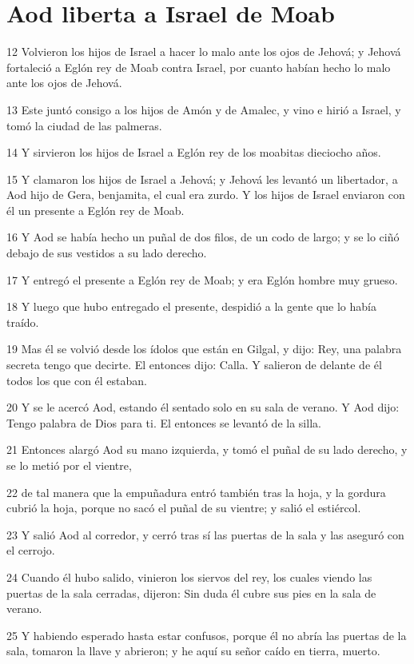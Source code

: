\section*{Aod liberta a Israel de Moab}

\par 12 Volvieron los hijos de Israel a hacer lo malo ante los ojos de Jehová; y Jehová fortaleció a Eglón rey de Moab contra Israel, por cuanto habían hecho lo malo ante los ojos de Jehová.
\par 13 Este juntó consigo a los hijos de Amón y de Amalec, y vino e hirió a Israel, y tomó la ciudad de las palmeras.
\par 14 Y sirvieron los hijos de Israel a Eglón rey de los moabitas dieciocho años.
\par 15 Y clamaron los hijos de Israel a Jehová; y Jehová les levantó un libertador, a Aod hijo de Gera, benjamita, el cual era zurdo. Y los hijos de Israel enviaron con él un presente a Eglón rey de Moab.
\par 16 Y Aod se había hecho un puñal de dos filos, de un codo   de largo; y se lo ciñó debajo de sus vestidos a su lado derecho.
\par 17 Y entregó el presente a Eglón rey de Moab; y era Eglón hombre muy grueso.
\par 18 Y luego que hubo entregado el presente, despidió a la gente que lo había traído.
\par 19 Mas él se volvió desde los ídolos que están en Gilgal, y dijo: Rey, una palabra secreta tengo que decirte. El entonces dijo: Calla. Y salieron de delante de él todos los que con él estaban.
\par 20 Y se le acercó Aod, estando él sentado solo en su sala de verano. Y Aod dijo: Tengo palabra de Dios para ti. El entonces se levantó de la silla.
\par 21 Entonces alargó Aod su mano izquierda, y tomó el puñal de su lado derecho, y se lo metió por el vientre,
\par 22 de tal manera que la empuñadura entró también tras la hoja, y la gordura cubrió la hoja, porque no sacó el puñal de su vientre; y salió el estiércol.
\par 23 Y salió Aod al corredor, y cerró tras sí las puertas de la sala y las aseguró con el cerrojo.
\par 24 Cuando él hubo salido, vinieron los siervos del rey, los cuales viendo las puertas de la sala cerradas, dijeron: Sin duda él cubre sus pies en la sala de verano.
\par 25 Y habiendo esperado hasta estar confusos, porque él no abría las puertas de la sala, tomaron la llave y abrieron; y he aquí su señor caído en tierra, muerto.

